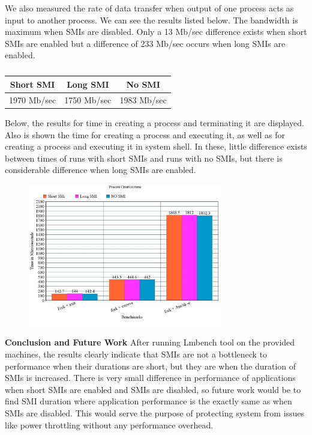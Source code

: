 \documentclass{IEEEtran}
\begin{document}
We also measured the rate of data transfer when output of one process acts as input to another process. We can see the results listed below. The bandwidth is maximum when SMIs are disabled. Only a 13 Mb/sec difference exists when short SMIs are enabled but a difference of 233 Mb/sec occurs when long SMIs are enabled.\\

\begin{table}[H]
\caption{ }
\centering
\begin{tabular}{|c|c|c|}
  \hline
  Short SMI & Long SMI & No SMI\\
  \hline
  1970 Mb/sec & 1750 Mb/sec & 1983 Mb/sec\\
  \hline
\end{tabular}
\end{table}

Below, the results for time in creating a process and terminating it are displayed. Also is shown the time for creating a process and executing it, as well as for creating a process and executing it in system shell. In these, little difference exists between times of runs with short SMIs and runs with no SMIs, but there is considerable difference when long SMIs are enabled.\\

\begin{figure}[H]
   \includegraphics[keepaspectratio=true,width=240pt]{mb_graph2.png}
   \caption{ }
\end{figure}

\textbf{Conclusion and Future Work}
After running Lmbench tool on the provided machines, the results clearly indicate that SMIs are not a bottleneck to performance when their durations are short, but they are when the duration of SMIs is increased. There is very small difference in performance of applications when short SMIs are enabled and SMIs are disabled, so future work would be to find SMI duration where application performance is the exactly same as when SMIs are disabled. This would serve the purpose of protecting system from issues like power throttling without any performance overhead.\\
\end{document}
